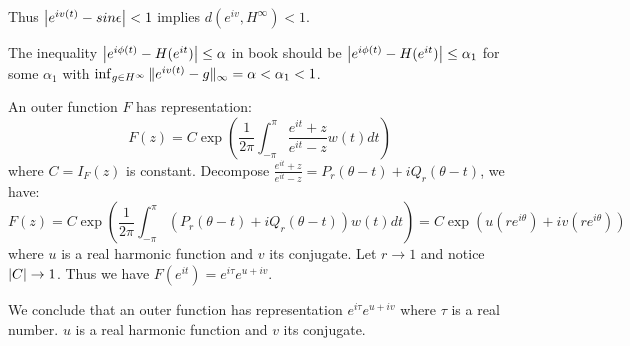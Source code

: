 \begin{remark}
    Thus $\left\lvert e^{iv(t)}-sin\epsilon\right\rvert<1$ implies $d(e^{iv},H^\infty)<1$.\par
    The inequality $\left\lvert e^{i\phi(t)}-H(e^{it})\right\rvert\leq\alpha$ in book should be $\left\lvert e^{i\phi(t)}-H(e^{it})\right\rvert\leq\alpha_1$ for some $\alpha_1$ with $\inf_{g\in H^\infty}{\lVert e^{iv(t)}-g\rVert_\infty}=\alpha<\alpha_1<1$.\par
    An outer function $F$ has representation:
    \begin{equation*}
        F(z)=C\exp{(\frac{1}{2\pi}\int_{-\pi}^{\pi}{\frac{e^{it}+z}{e^{it}-z}w(t)d t})}
    \end{equation*}
    where $C=I_F(z)$ is constant. Decompose $\frac{e^{it}+z}{e^{it}-z}=P_r(\theta-t)+iQ_r(\theta-t)$, we have:
    \begin{equation*}
        F(z)=C\exp{(\frac{1}{2\pi}\int_{-\pi}^{\pi}{(P_r(\theta-t)+iQ_r(\theta-t))w(t)d t})}=C\exp{(u(re^{i\theta})+iv(re^{i\theta}))}
    \end{equation*}
    where $u$ is a real harmonic function and $v$ its conjugate. Let $r\to 1$ and notice $\left\lvert C\right\rvert\to 1$. Thus we have $F(e^{it})=e^{i\tau}e^{u+iv}$.\par
    We conclude that an outer function has representation $e^{i\tau}e^{u+iv}$ where $\tau$ is a real number. $u$ is a real harmonic function and $v$ its conjugate.
\end{remark}
% 

